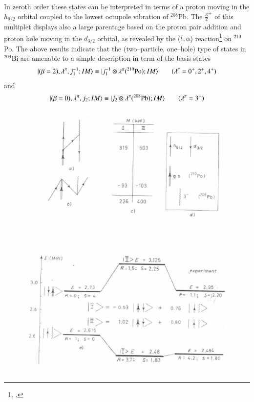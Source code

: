 In zeroth order these states can be interpreted in terms of a proton moving in the $h_{9/2}$ orbital coupled to the lowest octupole vibration of $^{208}$Pb. The $\frac{3}{2}^+$ of this multiplet displays also a large parentage based on the proton pair addition 
and proton hole moving in the $d_{3/2}$ orbital, as revealed by the ($t,\alpha$) reaction\footnote{\cite{Barnes:72}.} 
on $^{210}$Po. 
The above results indicate that the (two--particle, one--hole) type of states 
in $^{209}$Bi are amenable to a simple description in term of the basis states 
  \begin{align}\label{eqC1A87} 
   |{(\beta=2),\lambda^{\pi},j^{-1}_1;IM} \rangle\equiv |{j_1^{-1}\otimes \lambda^\pi(^{210}\text{Po});IM} \rangle\qquad(\lambda^{\pi}=0^+,2^+,4^+)
    \end{align} 
and 
  \begin{align}\label{eqC1A88} 
   |{(\beta=0),\lambda^{\pi},j_2;IM} \rangle\equiv |{j_2\otimes \lambda^\pi(^{208}\text{Pb});IM} \rangle\qquad(\lambda^{\pi}=3^-)
    \end{align} 
         \begin{figure}
         \centerline {
         \includegraphics*[width=12cm]{introduccion/figs/fig24a}
         }
         \end{figure}
